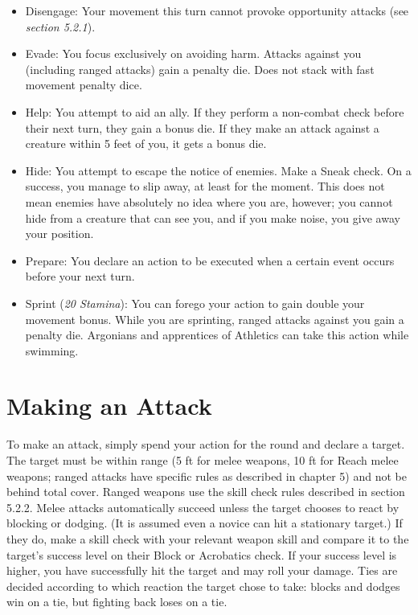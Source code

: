 \documentclass[12pt]{book}
\begin{document}
\begin{itemize}
	\item Disengage: Your movement this turn cannot provoke opportunity attacks (see \textit{section 5.2.1}).
	\item Evade: You focus exclusively on avoiding harm. Attacks against you (including ranged attacks) gain a penalty die. Does not stack with fast movement penalty dice.
	\item Help: You attempt to aid an ally. If they perform a non-combat check before their next turn, they gain a bonus die. If they make an attack against a creature within 5 feet of you, it gets a bonus die.
	\item Hide: You attempt to escape the notice of enemies. Make a Sneak check. On a success, you manage to slip away, at least for the moment. This does not mean enemies have absolutely no idea where you are, however; you cannot hide from a creature that can see you, and if you make noise, you give away your position.
	\item Prepare: You declare an action to be executed when a certain event occurs before your next turn.
	\item Sprint (\textit{20 Stamina}): You can forego your action to gain double your movement bonus. While you are sprinting, ranged attacks against you gain a penalty die. Argonians and apprentices of Athletics can take this action while swimming.
\end{itemize}

\section{Making an Attack}

To make an attack, simply spend your action for the round and declare a target. The target must be within range (5 ft for melee weapons, 10 ft for Reach melee weapons; ranged attacks have specific rules as described in chapter 5) and not be behind total cover. Ranged weapons use the skill check rules described in section 5.2.2. Melee attacks automatically succeed unless the target chooses to react by blocking or dodging. (It is assumed even a novice can hit a stationary target.) If they do, make a skill check with your relevant weapon skill and compare it to the target's success level on their Block or Acrobatics check. If your success level is higher, you have successfully hit the target and may roll your damage. Ties are decided according to which reaction the target chose to take: blocks and dodges win on a tie, but fighting back loses on a tie.
\end{document}
